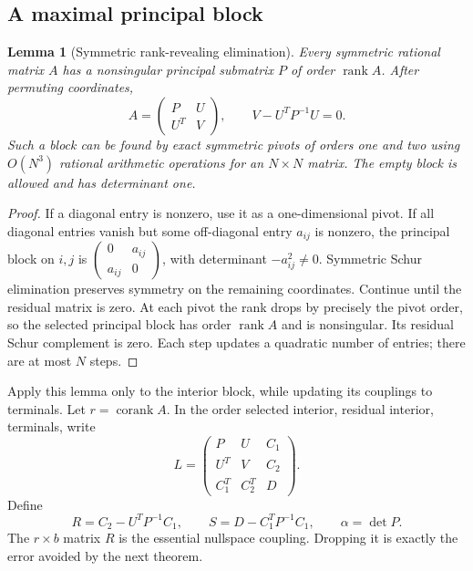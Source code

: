 \documentclass[11pt]{article}
\newtheorem{lemma}[theorem]{Lemma}
\theoremstyle{definition}
\theoremstyle{remark}
\newcommand{\rk}{\operatorname{rank}}
\newcommand{\corank}{\operatorname{corank}}
\begin{document}
\subsection{A maximal principal block}
\begin{lemma}[Symmetric rank-revealing elimination]\label{lem:principal}
Every symmetric rational matrix $A$ has a nonsingular principal submatrix
$P$ of order $\rk A$. After permuting coordinates,
\[
 A=\begin{pmatrix}P&U\\U^T&V\end{pmatrix},
 \qquad V-U^TP^{-1}U=0.
\]
Such a block can be found by exact symmetric pivots of orders one and two
using $O(N^3)$ rational arithmetic operations for an $N\times N$ matrix.
The empty block is allowed and has determinant one.
\end{lemma}
\begin{proof}
If a diagonal entry is nonzero, use it as a one-dimensional pivot. If all
diagonal entries vanish but some off-diagonal entry $a_{ij}$ is nonzero,
the principal block on $i,j$ is
$\left(\begin{smallmatrix}0&a_{ij}\\a_{ij}&0\end{smallmatrix}\right)$,
with determinant $-a_{ij}^2\ne0$. Symmetric Schur elimination preserves
symmetry on the remaining coordinates. Continue until the residual matrix
is zero. At each pivot the rank drops by precisely the pivot order, so the
selected principal block has order $\rk A$ and is nonsingular. Its residual
Schur complement is zero. Each step updates a quadratic number of entries;
there are at most $N$ steps.
\end{proof}

Apply this lemma only to the interior block, while updating its couplings
to terminals. Let $r=\corank A$. In the order selected interior, residual
interior, terminals, write
\begin{equation}\label{eq:fullblocks}
 L=\begin{pmatrix}
 P&U&C_1\\
 U^T&V&C_2\\
 C_1^T&C_2^T&D
 \end{pmatrix}.
\end{equation}
Define
\begin{equation}\label{eq:RS}
 R=C_2-U^TP^{-1}C_1,\qquad
 S=D-C_1^TP^{-1}C_1,\qquad \alpha=\det P.
\end{equation}
The $r\times b$ matrix $R$ is the essential nullspace coupling. Dropping it
is exactly the error avoided by the next theorem.
\end{document}
